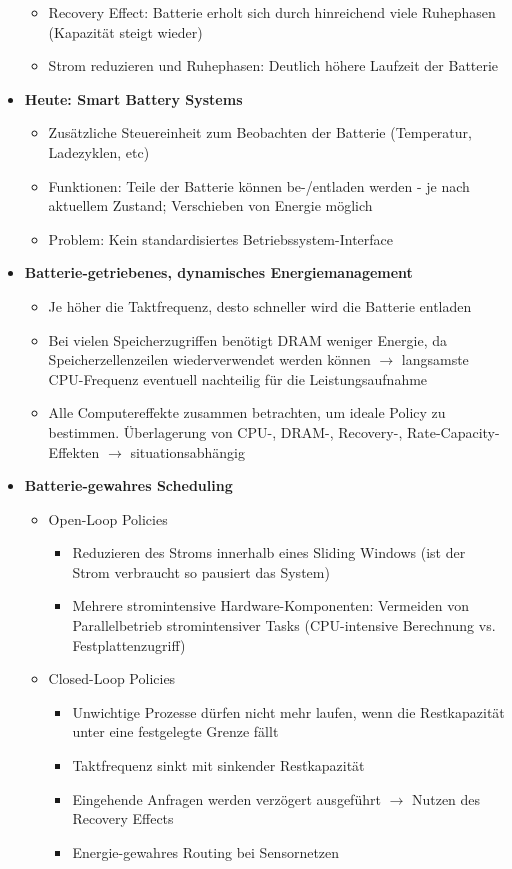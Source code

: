 \begin{itemize}
	\begin{itemize}
		\item Recovery Effect: Batterie erholt sich durch hinreichend viele Ruhephasen (Kapazität steigt wieder)
		\item Strom reduzieren und Ruhephasen: Deutlich höhere Laufzeit der Batterie
	\end{itemize}
	\item \textbf{Heute: Smart Battery Systems}
	\begin{itemize}
		\item Zusätzliche Steuereinheit zum Beobachten der Batterie (Temperatur, Ladezyklen, etc)
		\item Funktionen: Teile der Batterie können be-/entladen werden - je nach aktuellem Zustand; Verschieben von Energie möglich
		\item Problem: Kein standardisiertes Betriebssystem-Interface
	\end{itemize}
	\item \textbf{Batterie-getriebenes, dynamisches Energiemanagement}
	\begin{itemize}
		\item Je höher die Taktfrequenz, desto schneller wird die Batterie entladen
		\item Bei vielen Speicherzugriffen benötigt DRAM weniger Energie, da Speicherzellenzeilen wiederverwendet werden können \(\rightarrow\) langsamste CPU-Frequenz eventuell nachteilig für die Leistungsaufnahme
		\item Alle Computereffekte zusammen betrachten, um ideale Policy zu bestimmen. Überlagerung von CPU-, DRAM-, Recovery-, Rate-Capacity-Effekten \(\rightarrow\) situationsabhängig
	\end{itemize}
	\item \textbf{Batterie-gewahres Scheduling}
	\begin{itemize}
		\item Open-Loop Policies
		\begin{itemize}
			\item Reduzieren des Stroms innerhalb eines Sliding Windows (ist der Strom verbraucht so pausiert das System)
			\item Mehrere stromintensive Hardware-Komponenten: Vermeiden von Parallelbetrieb stromintensiver Tasks (CPU-intensive Berechnung vs. Festplattenzugriff) 
		\end{itemize}
		\item Closed-Loop Policies
		\begin{itemize}
			\item Unwichtige Prozesse dürfen nicht mehr laufen, wenn die Restkapazität unter eine festgelegte Grenze fällt
			\item Taktfrequenz sinkt mit sinkender Restkapazität
			\item Eingehende Anfragen werden verzögert ausgeführt \(\rightarrow\) Nutzen des Recovery Effects
			\item Energie-gewahres Routing bei Sensornetzen
		\end{itemize}
	\end{itemize}
\end{itemize}



